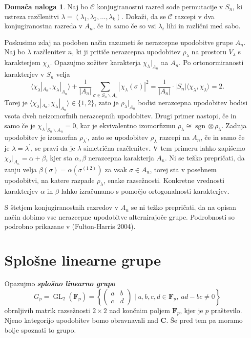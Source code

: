 \documentclass[11pt]{book}
\def\CC{\mathbf{C}}
\def\conclass{\mathcal{C}}
\def\FF{\mathbf{F}}
\DeclareMathOperator\sgn{sgn}
\DeclareMathOperator\GL{GL}
\def\definicija{\color{rdeca}\bf\em}
\def\literatura{\color{modra}}
\theoremstyle{definition}
\theoremstyle{zgled}
\theoremstyle{odprtproblem}
\theoremstyle{domacanaloga}
\newtheorem*{domacanaloga}{Domača naloga}
\theoremstyle{izrek}
\begin{document}
\begin{domacanaloga}
Naj bo $\conclass$ konjugiranostni razred sode permutacije v $S_n$, ki ustreza razčlenitvi $\lambda = (\lambda_1, \lambda_2, \dots, \lambda_k)$. Dokaži, da se $\conclass$ razcepi v dva konjugiranostna razreda v $A_n$, če in samo če so vsi $\lambda_i$ lihi in različni med sabo.
\end{domacanaloga}

Poskusimo zdaj na podoben način razumeti še nerazcepne upodobitve grupe $A_n$. Naj bo $\lambda$ razčlenitev $n$, ki ji pritiče nerazcepna upodobitev $\rho_{\lambda}$ na prostoru $V_{\lambda}$ s karakterjem $\chi_{\lambda}$. Opazujmo zožitev karakterja $\chi_{\lambda}|_{A_n}$ na $A_n$. Po ortonormiranosti karakterjev v $S_n$ velja
\[
    \langle \chi_{\lambda}|_{A_n}, \chi_{\lambda}|_{A_n} \rangle
    +
    \frac{1}{|A_n|} \sum_{\sigma \in S_n \backslash A_n} |\chi_{\lambda}(\sigma)|^2
    =
    \frac{1}{|A_n|} \cdot |S_n| \langle \chi_{\lambda}, \chi_{\lambda} \rangle
    = 2.
\]
Torej je $\langle \chi_{\lambda}|_{A_n}, \chi_{\lambda}|_{A_n} \rangle \in \{ 1, 2 \}$, zato je $\rho_{\lambda}|_{A_n}$ bodisi nerazcepna upodobitev bodisi vsota dveh neizomorfnih nerazcepnih upodobitev. Drugi primer nastopi, če in samo če je $\chi_{\lambda}|_{S_n \backslash A_n} = 0$, kar je ekvivalentno izomorfizmu $\rho_{\lambda} \cong \sgn \otimes \rho_{\lambda}$. Zadnja upodobitev je izomorfna $\rho_{\lambda^\prime}$, zato se upodobitev $\rho_{\lambda}$ razcepi na $A_n$, če in samo če je $\lambda = \lambda^\prime$, se pravi da je $\lambda$ simetrična razčlenitev. V tem primeru lahko zapišemo $\chi_{\lambda}|_{A_n} = \alpha + \beta$, kjer sta $\alpha, \beta$ nerazcepna karakterja $A_n$. Ni se težko prepričati, da zanju velja $\beta(\sigma) = \alpha(\sigma^{(1 \ 2)})$ za vsak $\sigma \in A_n$, torej sta v posebnem upodobitvi, na katere razpade $\rho_{\lambda}$, enake razsežnosti. Konkretne vrednosti karakterjev $\alpha$ in $\beta$ lahko izračunamo s pomočjo ortogonalnosti karakterjev. 

S štetjem konjugiranostnih razredov v $A_n$ se ni težko prepričati, da na opisan način dobimo vse nerazcepne upodobitve alternirajoče grupe. Podrobnosti so podrobno prikazane v {\literatura (Fulton-Harris 2004)}.


\section{Splošne linearne grupe}

Opazujmo {\definicija splošno linearno grupo}
\[
    G_p = {\textstyle \GL_2(\FF_p)} =
    \left\{ \begin{pmatrix} a & b \\ c & d \end{pmatrix} \mid a,b,c,d \in \FF_p, \ ad - bc \neq 0 \right\}
\] 
obrnljivih matrik razsežnosti $2 \times 2$ nad končnim poljem $\FF_p$, kjer je $p$ praštevilo. Njeno kategorijo upodobitev bomo obravnavali nad $\CC$. Še pred tem pa moramo bolje spoznati to grupo.
\end{document}
